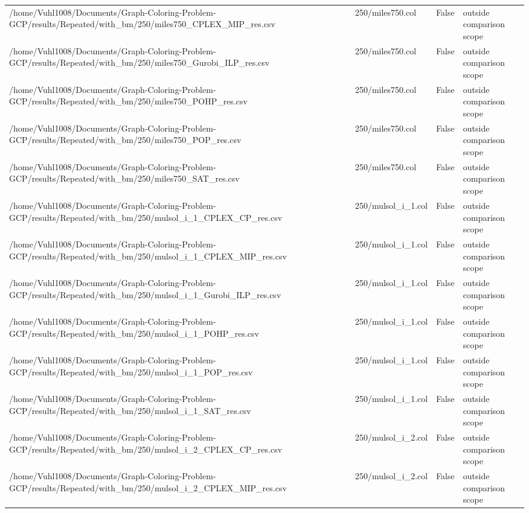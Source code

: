 \begin{table}[htbp]
\begin{tabular}{llll}
/home/Vuhl1008/Documents/Graph-Coloring-Problem-GCP/results/Repeated/with\_bm/250/miles750\_CPLEX\_MIP\_res.csv & 250/miles750.col & False & outside comparison scope \\
/home/Vuhl1008/Documents/Graph-Coloring-Problem-GCP/results/Repeated/with\_bm/250/miles750\_Gurobi\_ILP\_res.csv & 250/miles750.col & False & outside comparison scope \\
/home/Vuhl1008/Documents/Graph-Coloring-Problem-GCP/results/Repeated/with\_bm/250/miles750\_POHP\_res.csv & 250/miles750.col & False & outside comparison scope \\
/home/Vuhl1008/Documents/Graph-Coloring-Problem-GCP/results/Repeated/with\_bm/250/miles750\_POP\_res.csv & 250/miles750.col & False & outside comparison scope \\
/home/Vuhl1008/Documents/Graph-Coloring-Problem-GCP/results/Repeated/with\_bm/250/miles750\_SAT\_res.csv & 250/miles750.col & False & outside comparison scope \\
/home/Vuhl1008/Documents/Graph-Coloring-Problem-GCP/results/Repeated/with\_bm/250/mulsol\_i\_1\_CPLEX\_CP\_res.csv & 250/mulsol\_i\_1.col & False & outside comparison scope \\
/home/Vuhl1008/Documents/Graph-Coloring-Problem-GCP/results/Repeated/with\_bm/250/mulsol\_i\_1\_CPLEX\_MIP\_res.csv & 250/mulsol\_i\_1.col & False & outside comparison scope \\
/home/Vuhl1008/Documents/Graph-Coloring-Problem-GCP/results/Repeated/with\_bm/250/mulsol\_i\_1\_Gurobi\_ILP\_res.csv & 250/mulsol\_i\_1.col & False & outside comparison scope \\
/home/Vuhl1008/Documents/Graph-Coloring-Problem-GCP/results/Repeated/with\_bm/250/mulsol\_i\_1\_POHP\_res.csv & 250/mulsol\_i\_1.col & False & outside comparison scope \\
/home/Vuhl1008/Documents/Graph-Coloring-Problem-GCP/results/Repeated/with\_bm/250/mulsol\_i\_1\_POP\_res.csv & 250/mulsol\_i\_1.col & False & outside comparison scope \\
/home/Vuhl1008/Documents/Graph-Coloring-Problem-GCP/results/Repeated/with\_bm/250/mulsol\_i\_1\_SAT\_res.csv & 250/mulsol\_i\_1.col & False & outside comparison scope \\
/home/Vuhl1008/Documents/Graph-Coloring-Problem-GCP/results/Repeated/with\_bm/250/mulsol\_i\_2\_CPLEX\_CP\_res.csv & 250/mulsol\_i\_2.col & False & outside comparison scope \\
/home/Vuhl1008/Documents/Graph-Coloring-Problem-GCP/results/Repeated/with\_bm/250/mulsol\_i\_2\_CPLEX\_MIP\_res.csv & 250/mulsol\_i\_2.col & False & outside comparison scope \\

\end{tabular}
\end{table}

